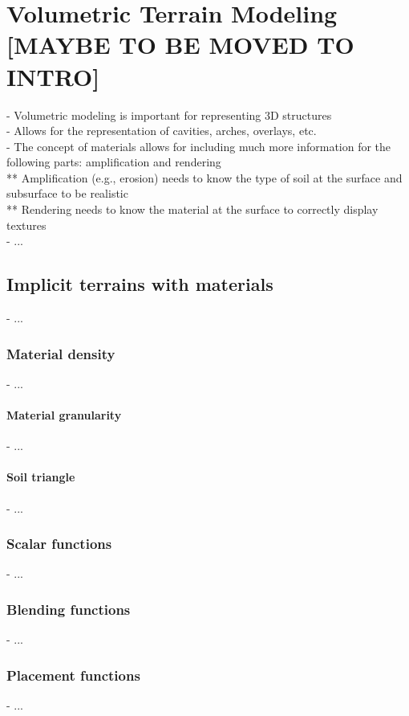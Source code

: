 \chapter{Volumetric Terrain Modeling [MAYBE TO BE MOVED TO INTRO]}
\label{chap:volumic-modeling}
\minitoc

- Volumetric modeling is important for representing 3D structures \\
- Allows for the representation of cavities, arches, overlays, etc. \\
- The concept of materials allows for including much more information for the following parts: amplification and rendering \\
** Amplification (e.g., erosion) needs to know the type of soil at the surface and subsurface to be realistic \\
** Rendering needs to know the material at the surface to correctly display textures \\
- ...

\section{Implicit terrains with materials}
\label{sec:volumic-modeling_implicit-terrain-with-materials}
- ...

\subsection{Material density}
- ...

\subsubsection{Material granularity}
- ...

\subsubsection{Soil triangle}
- ...

\subsection{Scalar functions}
- ...

\subsection{Blending functions}
- ...

\subsection{Placement functions}
- ...

